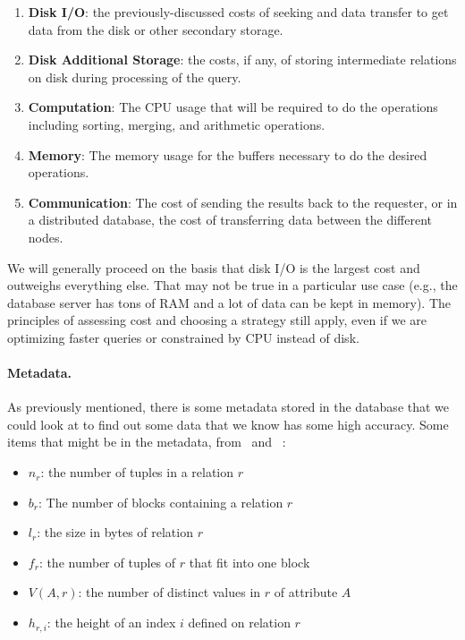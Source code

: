 \documentclass[a4paper]{report}
\begin{document}
\begin{enumerate}
	\item \textbf{Disk I/O}: the previously-discussed costs of seeking and data transfer to get data from the disk or other secondary storage.
	\item \textbf{Disk Additional Storage}: the costs, if any, of storing intermediate relations on disk during processing of the query.
	\item \textbf{Computation}: The CPU usage that will be required to do the operations including sorting, merging, and arithmetic operations.
	\item \textbf{Memory}: The memory usage for the buffers necessary to do the desired operations.
	\item \textbf{Communication}: The cost of sending the results back to the requester, or in  a distributed database, the cost of transferring data between the different nodes.
\end{enumerate}

We will generally proceed on the basis that disk I/O is the largest cost and outweighs everything else. That may not be true in a particular use case (e.g., the database server has tons of RAM and a lot of data can be kept in memory). The principles of assessing cost and choosing a strategy still apply, even if we are optimizing faster queries or constrained by CPU instead of disk.

\paragraph{Metadata.} As previously mentioned, there is some metadata stored in the database that we could look at to find out some data that we know has some high accuracy. Some items that might be in the metadata, from~\cite{dsc} and ~\cite{fds}:

\begin{itemize}
	\item $n_{r}$: the number of tuples in a relation $r$ 
	\item $b_{r}$: The number of blocks containing a relation $r$ 
	\item $l_{r}$: the size in bytes of relation $r$
	\item $f_{r}$: the number of tuples of $r$ that fit into one block
	\item $V(A, r)$: the number of distinct values in $r$ of attribute $A$
	\item $h_{r, i}$: the height of an index $i$ defined on relation $r$
\end{itemize}
\end{document}
